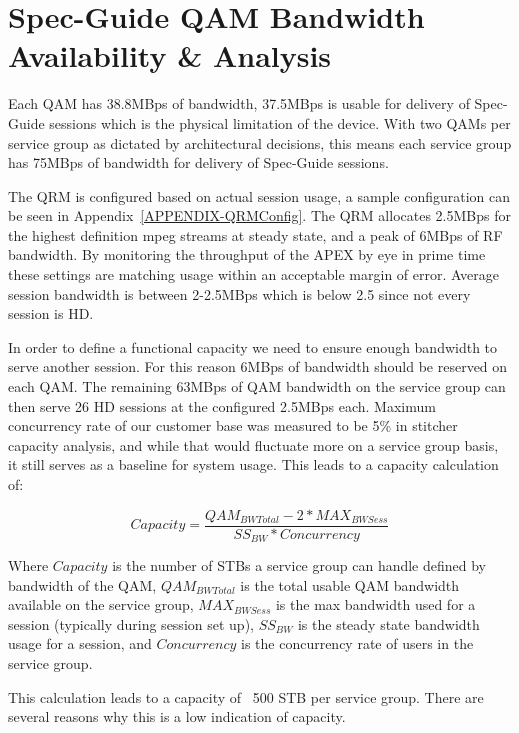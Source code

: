 \documentclass{article}
\begin{document}
\section{Spec-Guide QAM Bandwidth Availability \& Analysis}
\label{SECTION-QAMCapacity}

Each QAM has 38.8MBps of bandwidth, 37.5MBps is usable for delivery of Spec-Guide sessions which is the physical limitation of the device. With two QAMs per service group as dictated by architectural decisions, this means each service group has 75MBps of bandwidth for delivery of Spec-Guide sessions. 

The QRM is configured based on actual session usage, a sample configuration can be seen in Appendix~\ref{APPENDIX-QRMConfig}. The QRM allocates 2.5MBps for the highest definition mpeg streams at steady state, and a peak of 6MBps of RF bandwidth. By monitoring the throughput of the APEX by eye in prime time these settings are matching usage within an acceptable margin of error. Average session bandwidth is between 2-2.5MBps which is below 2.5 since not every session is HD. 

In order to define a functional capacity we need to ensure enough bandwidth to serve another session. For this reason 6MBps of bandwidth should be reserved on each QAM. The remaining 63MBps of QAM bandwidth on the service group can then serve 26 HD sessions at the configured 2.5MBps each. Maximum concurrency rate of our customer base was measured to be 5\% in stitcher capacity analysis, and while that would fluctuate more on a service group basis, it still serves as a baseline for system usage. This leads to a capacity calculation of: 

$$Capacity=\frac{QAM_{BWTotal}-2*MAX_{BWSess}}{SS_{BW}*Concurrency}$$ 

Where $Capacity$ is the number of STBs a service group can handle defined by bandwidth of the QAM, $QAM_{BWTotal}$ is the total usable QAM bandwidth available on the service group, $MAX_{BWSess}$ is the max bandwidth used for a session (typically during session set up), $SS_{BW}$ is the steady state bandwidth usage for a session, and $Concurrency$ is the concurrency rate of users in the service group. 

This calculation leads to a capacity of ~500 STB per service group. There are several reasons why this is a low indication of capacity. 
\end{document}
